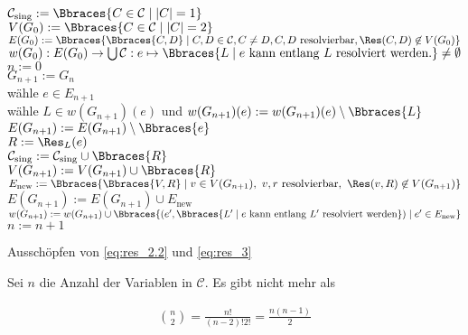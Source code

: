 \begin{solution}
\begin{algorithm}[H]
    $\mathcal C_\text{sing} := \Bbraces{C \in \mathcal C \mid |C| = 1}$ \\
    $V(G_0) := \Bbraces{C \in \mathcal C \mid |C| = 2}$ \\
    $E(G_0) := \Bbraces{\Bbraces{C, D} \mid C, D \in \mathcal C, C \neq D, C, D ~\text{resolvierbar}, \Res(C, D) \not \in V(G_0)}$ \\
    $w(G_0): E(G_0) \to \bigcup \mathcal C: e \mapsto \Bbraces{L \mid e ~\text{kann entlang}~ L ~\text{resolviert werden.}} \neq \emptyset$ \\
    $n := 0$ \\
    {
        $G_{n+1} := G_n$ \\
        wähle $e \in E_{n+1}$ \\
        wähle $L \in w(G_{n+1})(e)$ und $w(G_{n+1})(e) := w(G_{n+1})(e) \setminus \Bbraces{L}$ \\
        {
            $E(G_{n+1}) := E(G_{n+1}) \setminus \Bbraces{e}$ \\
        }
        $R := \Res_L(e)$ \\
        {
            $\mathcal C_\text{sing} := \mathcal C_\text{sing} \cup \Bbraces{R}$ \\
        }{
            $V(G_{n+1}) := V(G_{n+1}) \cup \Bbraces{R}$ \\
            $E_\text{new} := \Bbraces{\Bbraces{V, R} \mid v \in V(G_{n+1}), ~ v, r ~\text{resolvierbar}, ~ \Res(v, R) \not \in V(G_{n+1})}$ \\
            $E(G_{n+1}) := E(G_{n+1}) \cup E_\text{new}$ \\
            $w(G_{n+1}) := w(G_{n+1}) \cup \Bbraces{(e^\prime, \Bbraces{L^\prime \mid e ~\text{kann entlang}~ L^\prime ~\text{resolviert werden}}) \mid e^\prime \in E_\text{new}}$ \\
        }
        $n := n + 1$ \\
    }
    \caption
    {
        Ausschöpfen von \eqref{eq:res_2.2} und \eqref{eq:res_3}
    }
\end{algorithm}

Sei $n$ die Anzahl der Variablen in $\mathcal C$.
Es gibt nicht mehr als

\begin{align*}
    \binom{n}{2}
    =
    \frac{n!}{(n-2)! 2!}
    =
    \frac{n (n-1)}{2}
\end{align*}


\end{solution}
